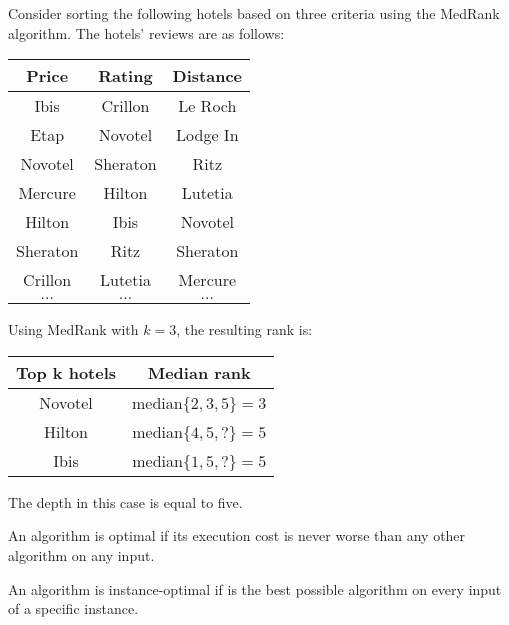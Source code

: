 \begin{example}
    Consider sorting the following hotels based on three criteria using the MedRank algorithm. 
    The hotels' reviews are as follows: 
    \begin{table}[H]
        \centering
        \begin{tabular}{c|c|c}
        \textbf{Price} & \textbf{Rating} & \textbf{Distance} \\ \hline
        Ibis           & Crillon         & Le Roch           \\
        Etap           & Novotel         & Lodge In          \\
        Novotel        & Sheraton        & Ritz              \\
        Mercure        & Hilton          & Lutetia           \\
        Hilton         & Ibis            & Novotel           \\
        Sheraton       & Ritz            & Sheraton          \\
        Crillon        & Lutetia         & Mercure           \\
        $\dots$        & $\dots$         & $\dots$          
        \end{tabular}
    \end{table}
    Using MedRank with $k=3$, the resulting rank is:
    \begin{table}[H]
        \centering
        \begin{tabular}{cc}
        \hline
        \textbf{Top k hotels}       & \textbf{Median rank}          \\ \hline
        Novotel                     & median$\{2,3,5\}=3$           \\ 
        Hilton                      & median$\{4,5,?\}=5$           \\ 
        Ibis                        & median$\{1,5,?\}=5$           \\ \hline
        \end{tabular}
    \end{table}
    The depth in this case is equal to five.
\end{example}
\begin{definition}
    An algorithm is optimal if its execution cost is never worse than any other algorithm on any input.
\end{definition}
\begin{definition}
    An algorithm is instance-optimal if is the best possible algorithm on every input of a specific instance. 
\end{definition}
